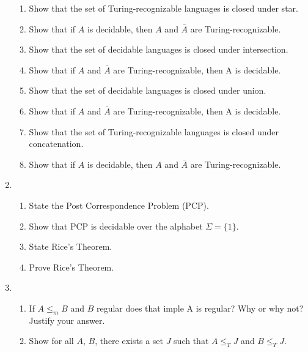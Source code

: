\documentclass[11pt]{article}
\begin{document}
\begin{enumerate}
\begin{enumerate}
	\item Show that the set of Turing-recognizable languages is closed under star.
	\item Show that if $A$ is decidable, then $A$ and $\bar{A}$ are Turing-recognizable.	
	\item Show that the set of decidable languages is closed under intersection.
	\item Show that if $A$ and $\bar{A}$ are Turing-recognizable, then A is decidable.
	
	\item Show that the set of decidable languages is closed under union.
	\item Show that if $A$ and $\bar{A}$ are Turing-recognizable, then A is decidable.
	
	\item Show that the set of Turing-recognizable languages is closed under concatenation.
	\item Show that if $A$ is decidable, then $A$ and $\bar{A}$ are Turing-recognizable.
	
\end{enumerate} 
\item 
\begin{enumerate}
	\item State the Post Correspondence Problem (PCP).
	\item Show that PCP is decidable over the alphabet $\Sigma = \{1\}$.
	
	\item State Rice's Theorem.
	\item Prove Rice's Theorem.
\end{enumerate}

\item 
\begin{enumerate}
	\item If $A\leq_m B$ and $B$ regular does that imple A is regular?  Why or why not?
		Justify your answer.
	\item Show for all $A$, $B$, there exists a set  $J$ such that 
		$A\leq_T J$ and $B\leq_T J$.
		

\end{enumerate}
\end{enumerate}
\end{document}
